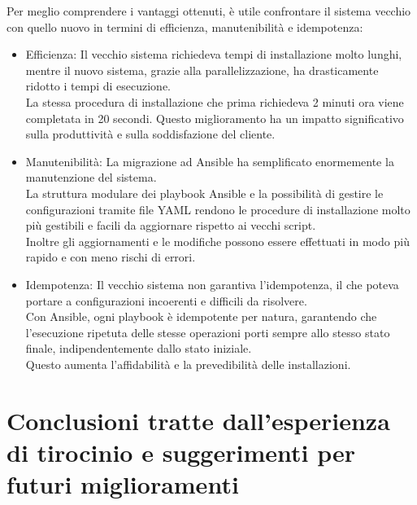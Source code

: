 Per meglio comprendere i vantaggi ottenuti, è utile confrontare il sistema
vecchio con quello nuovo in termini di efficienza, manutenibilità e idempotenza:
\begin{itemize}
  \item Efficienza: Il vecchio sistema richiedeva tempi di installazione molto
    lunghi, mentre il nuovo sistema, grazie alla parallelizzazione, ha drasticamente
    ridotto i tempi di esecuzione.\\ La stessa procedura di installazione che prima
    richiedeva 2 minuti ora viene completata in 20 secondi. Questo miglioramento
    ha un impatto significativo sulla produttività e sulla soddisfazione del
    cliente.

  \item Manutenibilità: La migrazione ad Ansible ha semplificato enormemente la
    manutenzione del sistema.\\ La struttura modulare dei playbook Ansible e la
    possibilità di gestire le configurazioni tramite file YAML rendono le
    procedure di installazione molto più gestibili e facili da aggiornare
    rispetto ai vecchi script.\\ Inoltre gli aggiornamenti e le modifiche
    possono essere effettuati in modo più rapido e con meno rischi di errori.

  \item Idempotenza: Il vecchio sistema non garantiva l'idempotenza, il che poteva
    portare a configurazioni incoerenti e difficili da risolvere.\\ Con Ansible,
    ogni playbook è idempotente per natura, garantendo che l'esecuzione ripetuta
    delle stesse operazioni porti sempre allo stesso stato finale,
    indipendentemente dallo stato iniziale.\\ Questo aumenta l'affidabilità e la
    prevedibilità delle installazioni.
\end{itemize}

\section{Conclusioni tratte dall’esperienza di tirocinio e suggerimenti per
futuri miglioramenti}
\label{sec:suggerimenti}

